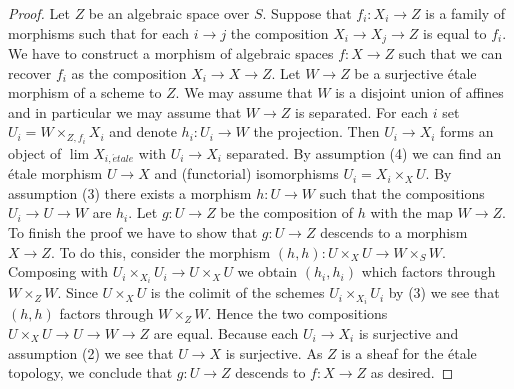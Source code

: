 \documentclass[10pt,a4paper]{amsart}
\theoremstyle{plain}
\theoremstyle{definition}
\theoremstyle{remark}
\numberwithin{equation}{subsection}
\def\lim{\mathop{\mathrm{lim}}\nolimits}
\def\etale{{\acute{e}tale}}
\begin{document}
\begin{proof}
Let $Z$ be an algebraic space over $S$. Suppose that $f_i : X_i \to Z$ is
a family of morphisms such that for each $i \to j$ the composition
$X_i \to X_j \to Z$ is equal to $f_i$. We have to construct a morphism
of algebraic spaces $f : X \to Z$ such that we can recover $f_i$ as
the composition $X_i \to X \to Z$. Let $W \to Z$ be a surjective
\'etale morphism of a scheme to $Z$. We may assume that $W$ is a
disjoint union of affines and in particular we may assume that
$W \to Z$ is separated. For each $i$ set
$U_i = W \times_{Z, f_i} X_i$ and denote $h_i : U_i \to W$ the projection.
Then $U_i \to X_i$ forms an object of $\lim X_{i, \etale}$
with $U_i \to X_i$ separated. By
assumption (4) we can find an \'etale morphism $U \to X$ and (functorial)
isomorphisms $U_i = X_i \times_X U$. By assumption (3) there exists a morphism
$h : U \to W$ such that the compositions $U_i \to U \to W$ are $h_i$.
Let $g : U \to Z$ be the composition of $h$ with the map $W \to Z$. To
finish the proof we have to show that $g : U \to Z$ descends to a morphism
$X \to Z$. To do this, consider the morphism
$(h, h) : U \times_X U \to W \times_S W$.
Composing with $U_i \times_{X_i} U_i \to U \times_X U$ we obtain
$(h_i, h_i)$ which factors through $W \times_Z W$. Since $U \times_X U$
is the colimit of the schemes $U_i \times_{X_i} U_i$ by (3) we see
that $(h, h)$ factors through $W \times_Z W$. Hence the two compositions
$U \times_X U \to U \to W \to Z$ are equal. Because each $U_i \to X_i$ is
surjective and assumption (2) we see that $U \to X$ is surjective.
As $Z$ is a sheaf for the \'etale topology, we conclude that
$g : U \to Z$ descends to $f : X \to Z$ as desired.
\end{proof}
\end{document}
